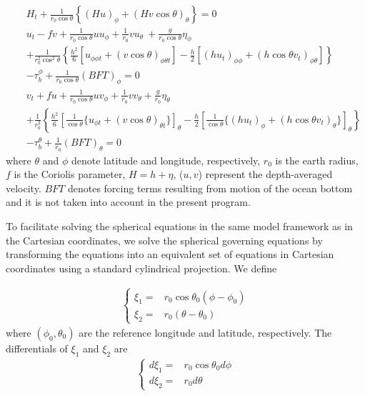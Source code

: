 \documentclass[11pt]{article}
\newcommand{\ba}{\begin{eqnarray}}
\newcommand{\ea}{\end{eqnarray}}
\begin{document}
\ba
& &H_t + \frac{1}{r_0 \cos\theta}\left\{ (Hu)_{\phi} + (H v \cos\theta)_{\theta}\right\} = 0
\label{eq3.1} \\
& &u_t - f v + \frac{1}{r_0 \cos\theta}u u_{\phi} + \frac{1}{r_0}vu_{\theta} \ 
+ \frac{g}{r_0 \cos\theta}\eta_{\phi} \nonumber \\ 
& &+ \frac{1}{r_0^2 \cos^2\theta}\left\{ \frac{h^2}{6} \left[ u_{\phi\phi t} +
(v\cos\theta)_{\phi\theta t} \right] - \frac{h}{2} \left[ (hu_t)_{\phi\phi} +
(h\cos\theta v_t)_{\phi\theta}\right] \right\} \nonumber \\  
& & - \tau_b^{\phi} + \frac{1}{r_0 \cos\theta} (BFT)_{\phi} = 0  \label{eq3.2} \\
& &v_t + fu + \frac{1}{r_0 \cos\theta}u v_{\phi} + \frac{1}{r_0} vv_{\theta}  
+ \frac{g}{r_0} \eta_{\theta} \nonumber \\ 
& &+ \frac{1}{r_0^2}\left\{\frac{h^2}{6} \left[\frac{1}{\cos\theta}\{ u_{\phi t} +
(v\cos\theta)_{\theta t} \} \right] _{\theta} - \frac{h}{2} \left[ \frac{1}{\cos\theta} \{
(hu_t)_{\phi} + (h\cos\theta v_t)_{\theta} \} \right]_{\theta} \right\}  \nonumber \\  
& & - \tau_b^{\theta} + \frac{1}{r_0} (BFT)_{\theta} = 0  \label{eq3.3}
\ea
where $\theta$ and $\phi$ denote latitude and longitude, respectively, $r_0$ is the earth radius, $f$ is the Coriolis parameter, $H = h + \eta$, ($u,v$) represent the depth-averaged velocity. $BFT$ denotes forcing terms resulting from motion of the ocean bottom and it is not taken into account in the present program. 

To facilitate solving the spherical equations  in the same model framework as in the Cartesian coordinates, we solve the spherical governing equations by transforming the equations into an equivalent set of equations in Cartesian coordinates using a standard cylindrical projection. We define

\ba
\left \{
\begin{array}{ll}
\xi_1= &r_0 \cos \theta_0 (\phi - \phi_0) \\
\xi_2 =& r_0 (\theta - \theta_0)
\end{array}
\right.
\ea
where $(\phi_0, \theta_0)$ are the reference longitude and latitude, respectively.  The differentials of $\xi_1$ and $\xi_2$ are
\ba
\left \{
\begin{array}{ll}
d \xi_1= &r_0 \cos \theta_0 d \phi \\
d \xi_2 =& r_0 d \theta
\end{array}
\right.
\ea
\end{document}
